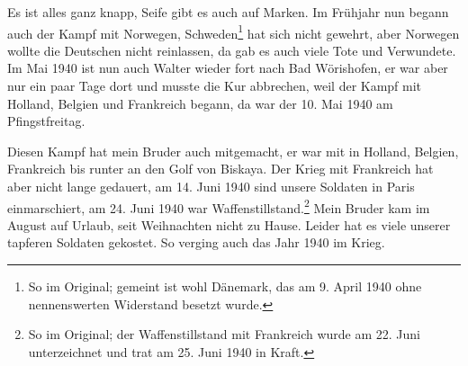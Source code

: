 \documentclass[a5paper,11pt,openany]{book}
\newcommand{\seite}[1]{\leavevmode\marginpar{\footnotesize\itshape\raggedright #1}\ignorespaces}
\begin{document}
\seite{49}
Es ist alles ganz knapp, Seife gibt es auch auf Marken.
Im Frühjahr nun begann auch der Kampf mit Norwegen,
  Schweden\footnote{So im Original; gemeint ist wohl Dänemark, das am 9. April 1940 ohne nennenswerten Widerstand besetzt wurde.} hat sich nicht gewehrt, aber Norwegen wollte die Deutschen nicht reinlassen,
  da gab es auch viele Tote und Verwundete.
Im Mai 1940 ist nun auch Walter wieder fort nach Bad Wörishofen,
  er war aber nur ein paar Tage dort und musste die Kur abbrechen, weil der Kampf mit Holland,
  Belgien und Frankreich begann, da war der 10. Mai 1940 am Pfingstfreitag.

\seite{50}
Diesen Kampf hat mein Bruder auch mitgemacht, er war mit in Holland, Belgien, Frankreich bis runter an den Golf von Biskaya.
Der Krieg mit Frankreich hat aber nicht lange gedauert,
  am 14. Juni 1940 sind unsere Soldaten in Paris einmarschiert, am 24. Juni 1940 war Waffenstillstand.\footnote{So im Original; der Waffenstillstand mit Frankreich wurde am 22. Juni unterzeichnet und trat am 25. Juni 1940 in Kraft.}
Mein Bruder kam im August auf Urlaub, seit Weihnachten nicht zu Hause.
Leider hat es viele unserer tapferen Soldaten gekostet.
So verging auch das Jahr 1940 im Krieg.
\end{document}
